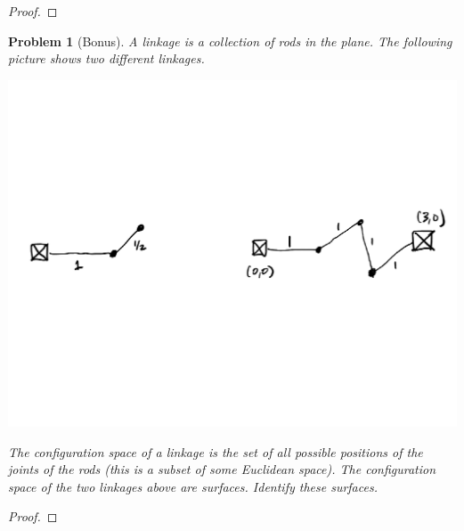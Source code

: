 \documentclass[11pt]{article}
\newtheorem{problem}{Problem}
\begin{document}
\begin{proof}

\end{proof}

\pagebreak

\begin{problem}[Bonus]
A linkage is a collection of rods in the plane. The following picture shows two different linkages. 
\begin{center}
\includegraphics[scale=.4]{linkage}
\end{center}
The configuration space of a linkage is the set of all possible positions of the joints of the rods (this is a subset of some Euclidean space). The configuration space of the two linkages above are surfaces. Identify these surfaces. 
\end{problem}

\begin{proof}

\end{proof}
\end{document}

